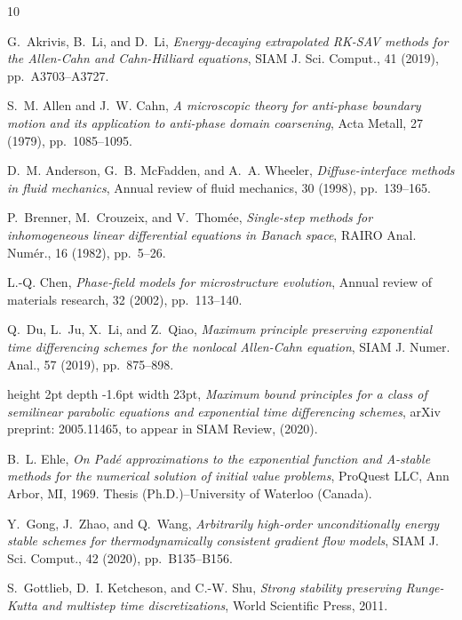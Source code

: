 \documentclass[10pt,final,leqno,onefignum,onetabnum]{siamltex}%
\begin{document}
\begin{thebibliography}{10}

{\sc G.~Akrivis, B.~Li, and D.~Li}, {\em Energy-decaying extrapolated
  {RK}-{SAV} methods for the {A}llen-{C}ahn and {C}ahn-{H}illiard equations},
  SIAM J. Sci. Comput., 41 (2019), pp.~A3703--A3727.

{\sc S.~M. Allen and J.~W. Cahn}, {\em A microscopic theory for anti-phase
  boundary motion and its application to anti-phase domain coarsening}, Acta
  Metall, 27 (1979), pp.~1085--1095.

{\sc D.~M. Anderson, G.~B. McFadden, and A.~A. Wheeler}, {\em Diffuse-interface
  methods in fluid mechanics}, Annual review of fluid mechanics, 30 (1998),
  pp.~139--165.

{\sc P.~Brenner, M.~Crouzeix, and V.~Thom\'{e}e}, {\em Single-step methods for
  inhomogeneous linear differential equations in {B}anach space}, RAIRO Anal.
  Num\'{e}r., 16 (1982), pp.~5--26.

{\sc L.-Q. Chen}, {\em Phase-field models for microstructure evolution}, Annual
  review of materials research, 32 (2002), pp.~113--140.

{\sc Q.~Du, L.~Ju, X.~Li, and Z.~Qiao}, {\em Maximum principle preserving
  exponential time differencing schemes for the nonlocal {A}llen-{C}ahn
  equation}, SIAM J. Numer. Anal., 57 (2019), pp.~875--898.

\leavevmode\vrule height 2pt depth -1.6pt width 23pt, {\em Maximum bound
  principles for a class of semilinear parabolic equations and exponential time
  differencing schemes}, arXiv preprint: 2005.11465, to appear in SIAM Review,
  (2020).

{\sc B.~L. Ehle}, {\em On {P}ad\'e approximations to the exponential function
  and {A}-stable methods for the numerical solution of initial value problems},
  ProQuest LLC, Ann Arbor, MI, 1969.
\newblock Thesis (Ph.D.)--University of Waterloo (Canada).

{\sc Y.~Gong, J.~Zhao, and Q.~Wang}, {\em Arbitrarily high-order
  unconditionally energy stable schemes for thermodynamically consistent
  gradient flow models}, SIAM J. Sci. Comput., 42 (2020), pp.~B135--B156.

{\sc S.~Gottlieb, D.~I. Ketcheson, and C.-W. Shu}, {\em Strong stability
  preserving Runge-Kutta and multistep time discretizations}, World Scientific
  Press, 2011.


\end{thebibliography}
\end{document}
